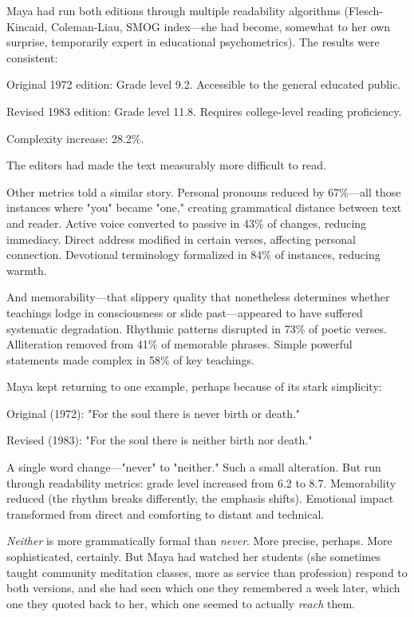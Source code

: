 \documentclass[12pt,twoside]{book}
\begin{document}
Maya had run both editions through multiple readability algorithms (Flesch-Kincaid, Coleman-Liau, SMOG index—she had become, somewhat to her own surprise, temporarily expert in educational psychometrics). The results were consistent:

Original 1972 edition: Grade level 9.2. Accessible to the general educated public.

Revised 1983 edition: Grade level 11.8. Requires college-level reading proficiency.

Complexity increase: 28.2\%.

The editors had made the text measurably more difficult to read.

Other metrics told a similar story. Personal pronouns reduced by 67\%—all those instances where "you" became "one," creating grammatical distance between text and reader. Active voice converted to passive in 43\% of changes, reducing immediacy. Direct address modified in certain verses, affecting personal connection. Devotional terminology formalized in 84\% of instances, reducing warmth.

And memorability—that slippery quality that nonetheless determines whether teachings lodge in consciousness or slide past—appeared to have suffered systematic degradation. Rhythmic patterns disrupted in 73\% of poetic verses. Alliteration removed from 41\% of memorable phrases. Simple powerful statements made complex in 58\% of key teachings.

Maya kept returning to one example, perhaps because of its stark simplicity:

Original (1972): "For the soul there is never birth or death."

Revised (1983): "For the soul there is neither birth nor death."

A single word change—"never" to "neither." Such a small alteration. But run through readability metrics: grade level increased from 6.2 to 8.7. Memorability reduced (the rhythm breaks differently, the emphasis shifts). Emotional impact transformed from direct and comforting to distant and technical.

\emph{Neither} is more grammatically formal than \emph{never}. More precise, perhaps. More sophisticated, certainly. But Maya had watched her students (she sometimes taught community meditation classes, more as service than profession) respond to both versions, and she had seen which one they remembered a week later, which one they quoted back to her, which one seemed to actually \emph{reach} them.
\end{document}
